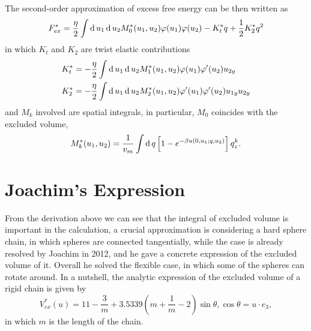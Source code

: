 The second-order approximation of excess free energy can be then written as
\begin{equation}
	F_{ex}^*=\frac{\eta}{2}\int\operatorname{d}u_1\operatorname{d}u_2M_0^*(u_1,u_2)\varphi(u_1)\varphi(u_2)-K_t^*q+\frac{1}{2}K_2^*q^2
\end{equation}
in which $K_t$ and $K_2$ are twist elastic contributions
\begin{equation}
	\begin{split}
		K_t^*&=-\frac{\eta}{2}\int\operatorname{d}u_1\operatorname{d}u_2M_1^*(u_1,u_2)\varphi(u_1)\varphi'(u_2)u_{2y}\\
		K_2^*&=-\frac{\eta}{2}\int\operatorname{d}u_1\operatorname{d}u_2M_2^*(u_1,u_2)\varphi'(u_1)\varphi'(u_2)u_{1y}u_{2y}
	\end{split}
\end{equation}
and $M_k$ involved are spatial integrals, in particular, $M_0$ coincides with the excluded volume,
\begin{equation}\label{Eqn:Mk}
	M_k^*(u_1,u_2)=\frac{1}{v_m}\int\operatorname{d}q \left[1-e^{-\beta u(0,u_1;q,u_2)}\right]q_z^k.
\end{equation}

\section{Joachim's Expression}\label{Sec:Joachim}

From the derivation above we can see that the integral of excluded volume is important in the calculation, a crucial approximation is considering a hard sphere chain, in which spheres are connected tangentially, while the case is already resolved by Joachim in 2012, and he gave a concrete expression of the excluded volume of it. Overall he solved the flexible case, in which some of the spheres can rotate around. In a nutshell, the analytic expression of the excluded volume of a rigid chain is given by
\begin{equation}\label{Eqn:Joachim}
	V_{ex}^*(u)=11-\frac{3}{m}+3.5339(m+\frac{1}{m}-2)\sin\theta,  \cos\theta=u\cdot e_3,
\end{equation}
in which $m$ is the length of the chain.

